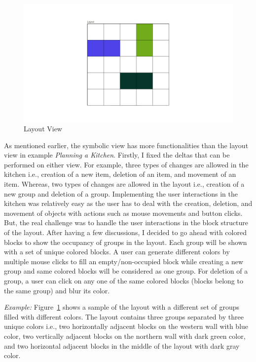 \begin{figure}[h]
	\includegraphics[width=1\textwidth]{figures/layout}
	\caption{Layout View}
	\label{fig:Layout}
\end{figure}

As mentioned earlier, the symbolic view has more functionalities than the layout view in example \textit{Planning a Kitchen}. Firstly, I fixed the deltas that can be performed on either view. For example, three types of changes are allowed in the kitchen i.e., creation of a new item, deletion of an item, and movement of an item. Whereas, two types of changes are allowed in the layout i.e., creation of a new group and deletion of a group. Implementing the user interactions in the kitchen was relatively easy as the user has to deal with the creation, deletion, and movement of objects with actions such as mouse movements and button clicks. But, the real challenge was to handle the user interactions in the block structure of the layout. After having a few discussions, I decided to go ahead with colored blocks to show the occupancy of groups in the layout. Each group will be shown with a set of unique colored blocks. A user can generate different colors by multiple mouse clicks to fill an empty/non-occupied block while creating a new group and same colored blocks will be considered as one group. For deletion of a group, a user can click on any one of the same colored blocks (blocks belong to the same group) and blur its color. 

\textit{Example:} Figure~\ref{fig:Layout} shows a sample of the layout with a different set of groups filled with different colors. The layout contains three groups separated by three unique colors i.e., two horizontally adjacent blocks on the western wall with {\color{blue} blue} color, two vertically adjacent blocks on the northern wall with {\color{darkgreen} dark green} color, and two horizontal adjacent blocks in the middle of the layout with {\color{darkgray} dark gray} color.

